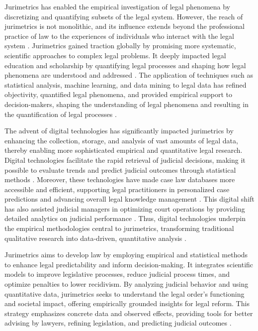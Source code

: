 Jurimetrics has enabled the empirical investigation of legal phenomena by discretizing and quantifying subsets of the legal system. However, the reach of jurimetrics is not monolithic, and its influence extends beyond the professional practice of law to the experiences of individuals who interact with the legal system \cite{10.1007/s11186-021-09453-1,unger2021process}. Jurimetrics gained traction globally by promising more systematic, scientific approaches to complex legal problems. It deeply impacted legal education and scholarship by quantifying legal processes and shaping how legal phenomena are understood and addressed \cite{1023071190721}. The application of techniques such as statistical analysis, machine learning, and data mining to legal data has refined objectivity, quantified legal phenomena, and provided empirical support to decision-makers, shaping the understanding of legal phenomena and resulting in the quantification of legal processes \cite{aafedeccbdaceab,cadcdbdbbdad,faecffafcada,aeadeccffe,ccdacdfbcdaf}.

The advent of digital technologies has significantly impacted jurimetrics by enhancing the collection, storage, and analysis of vast amounts of legal data, thereby enabling more sophisticated empirical and quantitative legal research. Digital technologies facilitate the rapid retrieval of judicial decisions, making it possible to evaluate trends and predict judicial outcomes through statistical methods \cite{colombo2017, colombo2017, de2010, luvizotto2020, nunes2018, nunes2018, colombo2017, nunes2018, nunes2018, nunes2018, nunes2018, nunes2018, ribeiro2021, nunes2018, maia2019}. Moreover, these technologies have made case law databases more accessible and efficient, supporting legal practitioners in personalized case predictions and advancing overall legal knowledge management \cite{de2010}. This digital shift has also assisted judicial managers in optimizing court operations by providing detailed analytics on judicial performance \cite{luvizotto2020}. Thus, digital technologies underpin the empirical methodologies central to jurimetrics, transforming traditional qualitative research into data-driven, quantitative analysis \cite{nunes2018}.

Jurimetrics aims to develop law by employing empirical and statistical methods to enhance legal predictability and inform decision-making. It integrates scientific models to improve legislative processes, reduce judicial process times, and optimize penalties to lower recidivism. By analyzing judicial behavior and using quantitative data, jurimetrics seeks to understand the legal order's functioning and societal impact, offering empirically grounded insights for legal reform. This strategy emphasizes concrete data and observed effects, providing tools for better advising by lawyers, refining legislation, and predicting judicial outcomes \cite{nunes2018, nunes2018, de2010, nunes2018, nunes2018}.

